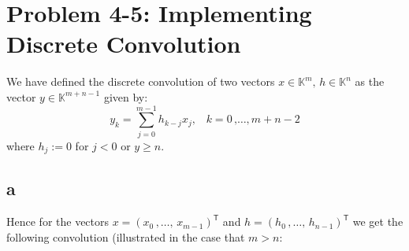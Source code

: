 \documentclass{article}
\begin{document}
\section*{Problem 4-5: Implementing Discrete Convolution}
We have defined the discrete convolution of two vectors $x \in \mathbb{K}^{m} \text{, } h \in \mathbb{K}^{n}$ as  the vector $y \in \mathbb{K}^{m + n - 1}$ given by:
\begin{equation*}
    y_{k} = \sum_{j = 0}^{m - 1}h_{k-j}x_{j} \text{,} \quad k = 0 \,\text{,} \dots \text{,} \,m + n - 2
\end{equation*}
where $h_{j} := 0$ for $j < 0$ or $y \geq n$.
\subsection*{a} Hence for the vectors $x = \left(x_{0} \, , \dots , \, x_{m-1}\right)^{\mathsf{T}}$ and $h = \left(h_{0} \, , \dots , \, h_{n-1}\right)^{\mathsf{T}}$ we get the following convolution (illustrated in the case that $m > n$:
\end{document}
